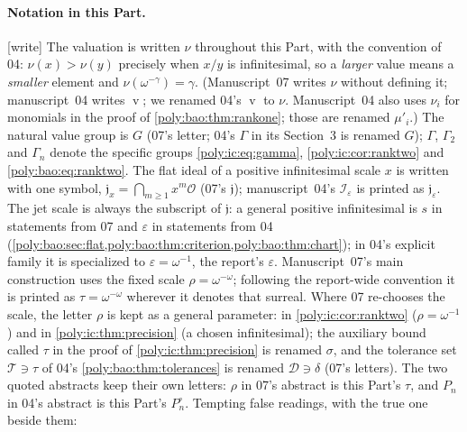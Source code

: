 \documentclass[11pt,a4paper]{article}
\numberwithin{equation}{section}
\theoremstyle{plain}
\newcommand{\wtag}{\textup{[write]}}%
\newcommand{\eps}{\varepsilon}
\newcommand{\OO}{\mathcal O}
\renewcommand{\vv}{\operatorname{v}}%
\newcommand{\JJ}{\mathfrak j}
\begin{document}
\paragraph{Notation in this Part.}
\wtag{} The valuation is written $\nu$ throughout this Part, with the
convention of 04: $\nu(x)>\nu(y)$ precisely when $x/y$ is infinitesimal, so
a \emph{larger} value means a \emph{smaller} element and
$\nu(\omega^{-\gamma})=\gamma$. (Manuscript~07 writes $\nu$ without defining
it; manuscript~04 writes $\vv$; we renamed 04's $\vv$ to $\nu$. Manuscript~04
also uses $\nu_i$ for monomials in the proof of
\cref{poly:bao:thm:rankone}; those are renamed $\mu'_i$.) The natural value
group is $G$ (07's letter; 04's $\Gamma$ in its Section~3 is renamed $G$);
$\Gamma$, $\Gamma_2$ and $\Gamma_n$ denote the specific groups
\eqref{poly:ic:eq:gamma}, \cref{poly:ic:cor:ranktwo} and
\eqref{poly:bao:eq:ranktwo}. The flat ideal of a positive infinitesimal
scale $x$ is written with one symbol, $\JJ_x=\bigcap_{m\geq1}x^m\OO$
(07's $\mathfrak j$); manuscript~04's $\mathcal I_\eps$ is printed as
$\JJ_\eps$. The jet scale is always the subscript of $\JJ$: a general
positive infinitesimal is $s$ in statements from 07 and $\eps$ in
statements from 04 (\cref{poly:bao:sec:flat,poly:bao:thm:criterion,poly:bao:thm:chart});
in 04's explicit family it is specialized to $\eps=\omega^{-1}$, the
report's $\eps$. Manuscript~07's main construction uses the fixed scale
$\rho=\omega^{-\omega}$; following the report-wide convention it is printed
as $\tau=\omega^{-\omega}$ wherever it denotes that surreal. Where 07
re-chooses the scale, the letter $\rho$ is kept as a general parameter: in
\cref{poly:ic:cor:ranktwo} ($\rho=\omega^{-1}$) and in
\cref{poly:ic:thm:precision} (a chosen infinitesimal); the auxiliary bound
called $\tau$ in the proof of \cref{poly:ic:thm:precision} is renamed
$\sigma$, and the tolerance set $\mathcal T\ni\tau$ of 04's
\cref{poly:bao:thm:tolerances} is renamed $\mathcal D\ni\delta$ (07's
letters). The two quoted abstracts keep their own letters: $\rho$ in 07's
abstract is this Part's $\tau$, and $P_n$ in 04's abstract is this Part's
$P^\circ_n$. Tempting false readings, with the true one beside them:
\end{document}
